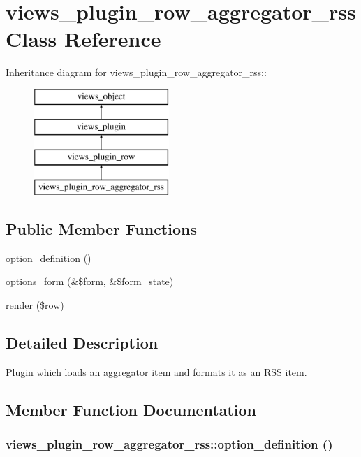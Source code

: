\hypertarget{classviews__plugin__row__aggregator__rss}{
\section{views\_\-plugin\_\-row\_\-aggregator\_\-rss Class Reference}
\label{classviews__plugin__row__aggregator__rss}
}
Inheritance diagram for views\_\-plugin\_\-row\_\-aggregator\_\-rss::\begin{figure}[H]
\begin{center}
\leavevmode
\includegraphics[height=4cm]{classviews__plugin__row__aggregator__rss}
\end{center}
\end{figure}
\subsection*{Public Member Functions}
\begin{CompactItemize}
\item 
\hyperlink{classviews__plugin__row__aggregator__rss_653e8ed46f98dbbc630b58bb7212f617}{option\_\-definition} ()
\item 
\hyperlink{classviews__plugin__row__aggregator__rss_a5c9bce3143901863f1a446b622fda9c}{options\_\-form} (\&\$form, \&\$form\_\-state)
\item 
\hyperlink{classviews__plugin__row__aggregator__rss_dd4aa0892bf305556bb9a04c62da6027}{render} (\$row)
\end{CompactItemize}


\subsection{Detailed Description}
Plugin which loads an aggregator item and formats it as an RSS item. 

\subsection{Member Function Documentation}
\hypertarget{classviews__plugin__row__aggregator__rss_653e8ed46f98dbbc630b58bb7212f617}{
\subsubsection[{option\_\-definition}]{\setlength{\rightskip}{0pt plus 5cm}views\_\-plugin\_\-row\_\-aggregator\_\-rss::option\_\-definition ()}}
\label{classviews__plugin__row__aggregator__rss_653e8ed46f98dbbc630b58bb7212f617}


